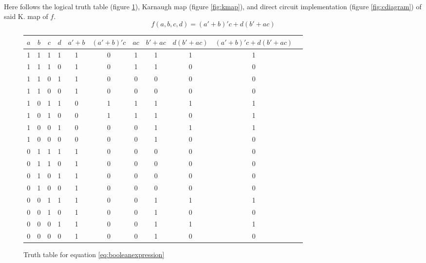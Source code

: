 \documentclass[11pt]{article}
\begin{document}
\begin{question}

	Here follows the logical truth table (figure \ref{fig:ttable}), Karnaugh map (figure \ref{fig:kmap}), and direct circuit
	implementation (figure \ref{fig:cdiagram}) of said K. map of $f$. \begin{equation} \label{eq:booleanexpression} f(a,b,c,d) = (a'+b)'c+d(b'+ac) \end{equation}

	\begin{figure}[h]
		\begin{center}
			\begin{tabular} {c c c c | c c c c c c c}
				$a$ & $b$ & $c$ & $d$ & $a'+b$ & $(a'+b)'c$ & $ac$ & $b'+ac$ & $d(b'+ac)$ & $(a'+b)'c+d(b'+ac)$ \\
				\hline
				1 & 1 & 1 & 1 & 1 & 0 & 1 & 1 & 1 & 1 \\
				1 & 1 & 1 & 0 & 1 & 0 & 1 & 1 & 0 & 0 \\
				1 & 1 & 0 & 1 & 1 & 0 & 0 & 0 & 0 & 0 \\
				1 & 1 & 0 & 0 & 1 & 0 & 0 & 0 & 0 & 0 \\
				1 & 0 & 1 & 1 & 0 & 1 & 1 & 1 & 1 & 1 \\
				1 & 0 & 1 & 0 & 0 & 1 & 1 & 1 & 0 & 1 \\
				1 & 0 & 0 & 1 & 0 & 0 & 0 & 1 & 1 & 1 \\
				1 & 0 & 0 & 0 & 0 & 0 & 0 & 1 & 0 & 0 \\
				0 & 1 & 1 & 1 & 1 & 0 & 0 & 0 & 0 & 0 \\
				0 & 1 & 1 & 0 & 1 & 0 & 0 & 0 & 0 & 0 \\
				0 & 1 & 0 & 1 & 1 & 0 & 0 & 0 & 0 & 0 \\
				0 & 1 & 0 & 0 & 1 & 0 & 0 & 0 & 0 & 0 \\
				0 & 0 & 1 & 1 & 1 & 0 & 0 & 1 & 1 & 1 \\
				0 & 0 & 1 & 0 & 1 & 0 & 0 & 1 & 0 & 0 \\
				0 & 0 & 0 & 1 & 1 & 0 & 0 & 1 & 1 & 1 \\
				0 & 0 & 0 & 0 & 1 & 0 & 0 & 1 & 0 & 0 \\
			\end{tabular}
		\end{center}
		\caption{\label{fig:ttable} Truth table for equation \ref{eq:booleanexpression}}
	\end{figure}

	\begin{figure}[h]
		\begin{center}
\end{center}
\end{figure}
\end{question}
\end{document}
